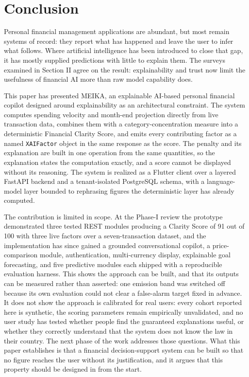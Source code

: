 \documentclass[conference]{IEEEtran}
\begin{document}
\section{Conclusion}

Personal financial management applications are abundant, but most remain systems of record: they report what has happened and leave the user to infer what follows. Where artificial intelligence has been introduced to close that gap, it has mostly supplied predictions with little to explain them. The surveys examined in Section II agree on the result: explainability and trust now limit the usefulness of financial AI more than raw model capability does.

This paper has presented MEIKA, an explainable AI-based personal financial copilot designed around explainability as an architectural constraint. The system computes spending velocity and month-end projection directly from live transaction data, combines them with a category-concentration measure into a deterministic Financial Clarity Score, and emits every contributing factor as a named \texttt{XAIFactor} object in the same response as the score. The penalty and its explanation are built in one operation from the same quantities, so the explanation states the computation exactly, and a score cannot be displayed without its reasoning. The system is realized as a Flutter client over a layered FastAPI backend and a tenant-isolated PostgreSQL schema, with a language-model layer bounded to rephrasing figures the deterministic layer has already computed.

The contribution is limited in scope. At the Phase-I review the prototype demonstrated three tested REST modules producing a Clarity Score of 91 out of 100 with three live factors over a seven-transaction dataset, and the implementation has since gained a grounded conversational copilot, a price-comparison module, authentication, multi-currency display, explainable goal forecasting, and five predictive modules each shipped with a reproducible evaluation harness. This shows the approach can be built, and that its outputs can be measured rather than asserted: one emission band was switched off because its own evaluation could not clear a false-alarm target fixed in advance. It does not show the approach is calibrated for real users: every cohort reported here is synthetic, the scoring parameters remain empirically unvalidated, and no user study has tested whether people find the guaranteed explanations useful, or whether they correctly understand that the system does not know the law in their country. The next phase of the work addresses those questions. What this paper establishes is that a financial decision-support system can be built so that no figure reaches the user without its justification, and it argues that this property should be designed in from the start.
\end{document}
